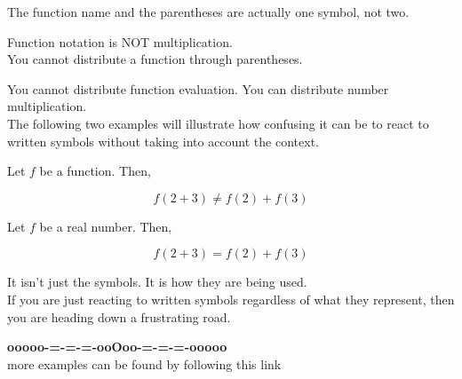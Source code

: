 \documentclass{ximera}
\begin{document}
The function name and the parentheses are actually one symbol, not two. \\


\begin{warning}

Function notation is NOT multiplication. \\

You cannot distribute a function through parentheses.


\end{warning}

You cannot distribute function evaluation. You can distribute number multiplication. \\


The following two examples will illustrate how confusing it can be to react to written symbols without taking into account the context.  











\begin{example}


Let $f$ be a function.  Then, 


\[
f(2 + 3) \ne f(2) + f(3)
\]


\end{example}





\begin{example}


Let $f$ be a real number.  Then, 


\[
f(2 + 3) = f(2) + f(3)
\]


\end{example}


It isn't just the symbols.  It is how they are being used. \\


If you are just reacting to written symbols regardless of what they represent, then you are heading down a frustrating road.





\begin{center}
\textbf{\textcolor{green!50!black}{ooooo-=-=-=-ooOoo-=-=-=-ooooo}} \\

more examples can be found by following this link\\ 

\end{center}
\end{document}
